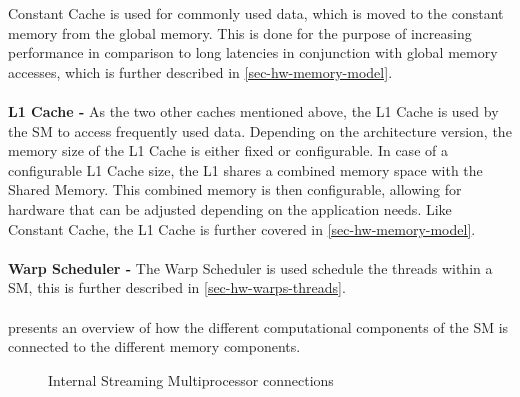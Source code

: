 Constant Cache is used for commonly used data, which is moved to the constant memory from the global memory.
This is done for the purpose of increasing performance in comparison to long latencies in conjunction with global memory accesses, which is further described in \cref{sec-hw-memory-model}.
\\\\	
\textbf{L1 Cache -} As the two other caches mentioned above, the L1 Cache is used by the SM to access frequently used data. 
Depending on the architecture version, the memory size of the L1 Cache is either fixed or configurable.
In case of a configurable L1 Cache size, the L1 shares a combined memory space with the Shared Memory.
This combined memory is then configurable, allowing for hardware that can be adjusted depending on the application needs. Like Constant Cache, the L1 Cache is further covered in \cref{sec-hw-memory-model}.
\\\\
\textbf{Warp Scheduler -} The Warp Scheduler is used schedule the threads within a SM, this is further described in \cref{sec-hw-warps-threads}.
\\\\	
 presents an overview of how the different computational components of the SM is connected to the different memory components.

\begin{figure}[H]
	\centering
	\caption{Internal Streaming Multiprocessor connections}
	\label{fig:hw-sm-inside}
\end{figure}